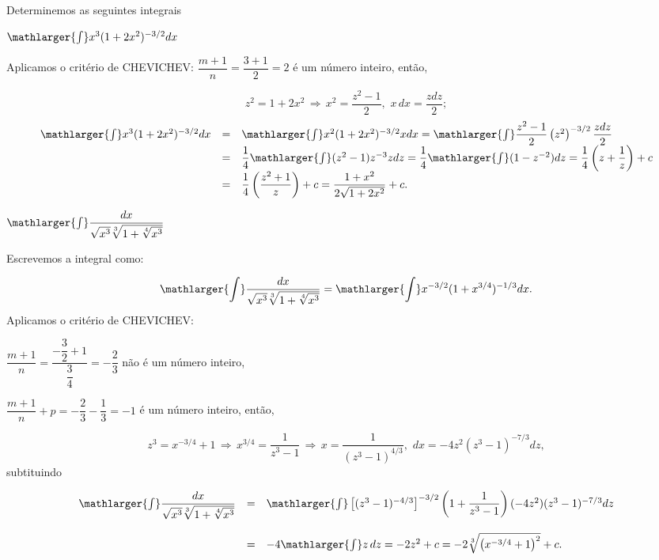 \cleardoublepage\documentclass[../main.tex]{subfiles}
\begin{document}
\begin{ex}
Determinemos as seguintes integrais
\begin{compactenum}[a)]
\item \(\mathlarger{\int}x^3(1+2x^2)^{-3/2}dx \)

\begin{solution}
Aplicamos o critério de CHEVICHEV: \(\dfrac{m+1}{n}=\dfrac{3+1}{2}=2\) é um número inteiro, então,

\[ z^2=1+2x^2\,\Rightarrow\,x^2=\dfrac{z^2-1}{2},\,\, x\,dx=\dfrac{zdz}{2}; \] \[ \begin{array}{rcl} \mathlarger{\int}x^3(1+2x^2)^{-3/2}dx &=& \mathlarger{\int}x^2(1+2x^2)^{-3/2}xdx = \mathlarger{\int}\dfrac{z^2-1}{2}\left(z^2 \right)^{-3/2}\dfrac{zdz}{2}\\ &=&\dfrac{1}{4}\mathlarger{\int}(z^2-1)z^{-3}zdz= \dfrac{1}{4}\mathlarger{\int}(1-z^{-2})dz=\dfrac{1}{4}\left(z+\dfrac{1}{z}\right)+c\\ &=&\dfrac{1}{4}\left(\dfrac{z^2+1}{z} \right)+c = \dfrac{1+x^2}{2\sqrt{1+2x^2}}+c. \end{array} \]
\end{solution}
\item \(\mathlarger{\int}\dfrac{dx}{\sqrt{x^3} \sqrt[3]{1+\sqrt[4]{x^3}}} \)

\begin{solution}
Escrevemos a integral como:

\[ \mathlarger{\int}\dfrac{dx}{\sqrt{x^3} \sqrt[3]{1+\sqrt[4]{x^3}}} = \mathlarger{\int}x^{-3/2}(1+x^{3/4})^{-1/3}dx . \]
Aplicamos o critério de CHEVICHEV:

\(\dfrac{m+1}{n}=\dfrac{-\dfrac{3}{2}+1}{\dfrac{3}{4}}=-\dfrac{2}{3}\) não é um número inteiro,

\(\dfrac{m+1}{n}+p=-\dfrac{2}{3}-\dfrac{1}{3}=-1\) é um número inteiro, então,

\[ z^3=x^{-3/4}+1\,\Rightarrow\,x^{3/4}=\dfrac{1}{z^3-1}\,\Rightarrow\, x=\dfrac{1}{(z^3-1)^{4/3}},\,\, dx=-4z^2(z^3-1)^{-7/3}dz, \]
subtituindo

\[ \begin{array}{rcl} \mathlarger{\int}\dfrac{dx}{\sqrt{x^3} \sqrt[3]{1+\sqrt[4]{x^3}}} &=& \mathlarger{\int}\left[(z^3-1)^{-4/3} \right]^{-3/2}\left(1+\dfrac{1}{z^3-1} \right) (-4z^2)(z^3-1)^{-7/3}dz\\ \\ &=&-4\mathlarger{\int}z\,dz = -2z^2+c=-2\sqrt[3]{\left(x^{-3/4}+1\right)^2}+c. \end{array} \]
\end{solution}
\end{compactenum}
\end{ex}
\end{document}
